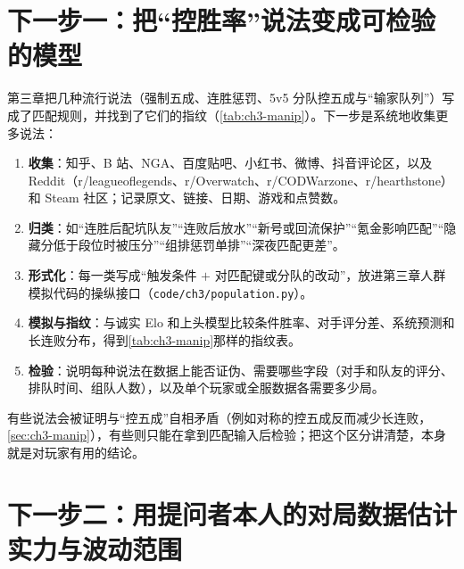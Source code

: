 \section*{下一步一：把“控胜率”说法变成可检验的模型}
\label{sec:next-conspiracy}

第三章把几种流行说法（强制五成、连胜惩罚、5v5 分队控五成与“输家队列”）写成了匹配规则，并找到了它们的指纹（\cref{tab:ch3-manip}）。下一步是系统地收集更多说法：
\begin{enumerate}
  \item \textbf{收集}：知乎、B 站、NGA、百度贴吧、小红书、微博、抖音评论区，以及 Reddit（r/leagueoflegends、r/Overwatch、r/CODWarzone、r/hearthstone）和 Steam 社区；记录原文、链接、日期、游戏和点赞数。
  \item \textbf{归类}：如“连胜后配坑队友”“连败后放水”“新号或回流保护”“氪金影响匹配”“隐藏分低于段位时被压分”“组排惩罚单排”“深夜匹配更差”。
  \item \textbf{形式化}：每一类写成“触发条件 $+$ 对匹配键或分队的改动”，放进第三章人群模拟代码的操纵接口（\texttt{code/\allowbreak ch3/\allowbreak population.py}）。
  \item \textbf{模拟与指纹}：与诚实 Elo 和上头模型比较条件胜率、对手评分差、系统预测和长连败分布，得到\cref{tab:ch3-manip}那样的指纹表。
  \item \textbf{检验}：说明每种说法在数据上能否证伪、需要哪些字段（对手和队友的评分、排队时间、组队人数），以及单个玩家或全服数据各需要多少局。
\end{enumerate}
有些说法会被证明与“控五成”自相矛盾（例如对称的控五成反而减少长连败，\cref{sec:ch3-manip}），有些则只能在拿到匹配输入后检验；把这个区分讲清楚，本身就是对玩家有用的结论。

\section*{下一步二：用提问者本人的对局数据估计实力与波动范围}
\label{sec:next-userdata}

